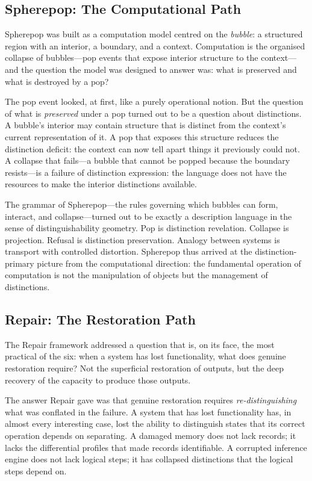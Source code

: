 \documentclass[12pt, letterpaper]{article}
\theoremstyle{remark}
\begin{document}
\subsection{Spherepop: The Computational Path}

Spherepop was built as a computation model centred on the \emph{bubble}: a
structured region with an interior, a boundary, and a context.  Computation
is the organised collapse of bubbles---pop events that expose interior
structure to the context---and the question the model was designed to answer
was: what is preserved and what is destroyed by a pop?

The pop event looked, at first, like a purely operational notion.  But the
question of what is \emph{preserved} under a pop turned out to be a question
about distinctions.  A bubble's interior may contain structure that is
distinct from the context's current representation of it.  A pop that exposes
this structure reduces the distinction deficit: the context can now tell apart
things it previously could not.  A collapse that fails---a bubble that cannot
be popped because the boundary resists---is a failure of distinction
expression: the language does not have the resources to make the interior
distinctions available.

The grammar of Spherepop---the rules governing which bubbles can form,
interact, and collapse---turned out to be exactly a description language in
the sense of distinguishability geometry.  Pop is distinction revelation.
Collapse is projection.  Refusal is distinction preservation.  Analogy
between systems is transport with controlled distortion.  Spherepop thus
arrived at the distinction-primary picture from the computational direction:
the fundamental operation of computation is not the manipulation of objects
but the management of distinctions.

\subsection{Repair: The Restoration Path}

The Repair framework addressed a question that is, on its face, the most
practical of the six: when a system has lost functionality, what does
genuine restoration require?  Not the superficial restoration of outputs,
but the deep recovery of the capacity to produce those outputs.

The answer Repair gave was that genuine restoration requires
\emph{re-distinguishing} what was conflated in the failure.  A system that
has lost functionality has, in almost every interesting case, lost the
ability to distinguish states that its correct operation depends on
separating.  A damaged memory does not lack records; it lacks the
differential profiles that made records identifiable.  A corrupted inference
engine does not lack logical steps; it has collapsed distinctions that the
logical steps depend on.
\end{document}

